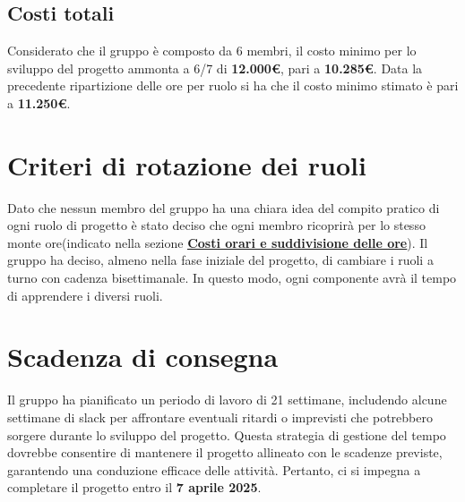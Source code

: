 \documentclass[a4paper, 12pt]{article}
\begin{document}
\subsection{Costi totali}
Considerato che il gruppo è composto da 6 membri, il costo minimo per lo sviluppo del 
progetto ammonta a 6/7 di \textbf{12.000€}, pari a \textbf{10.285€}. 
Data la precedente ripartizione delle ore per ruolo si ha che il costo minimo stimato è pari a \textbf{11.250€}.

\section{Criteri di rotazione dei ruoli}
\label{sec:criteri_rotazione_ruoli}
Dato che nessun membro del gruppo ha una chiara idea del compito pratico di ogni ruolo di progetto è stato deciso che ogni membro ricoprirà per lo stesso monte ore(indicato nella sezione \hyperref[tab:ore]{\textbf{\underline{Costi orari e suddivisione delle ore}}}).
Il gruppo ha deciso, almeno nella fase iniziale del progetto, di cambiare i ruoli a turno con cadenza bisettimanale. In questo modo, ogni componente avrà il tempo di apprendere i diversi ruoli.

\section{Scadenza di consegna}
\label{sec:scadenza}
Il gruppo ha pianificato un periodo di lavoro di 21 settimane, includendo alcune settimane di slack per affrontare eventuali ritardi o imprevisti che potrebbero sorgere durante lo sviluppo del progetto.
Questa strategia di gestione del tempo dovrebbe consentire di mantenere il progetto allineato con le scadenze previste, garantendo una conduzione efficace delle attività.
Pertanto, ci si impegna a completare il progetto entro il \textbf{7 aprile 2025}.
\end{document}
